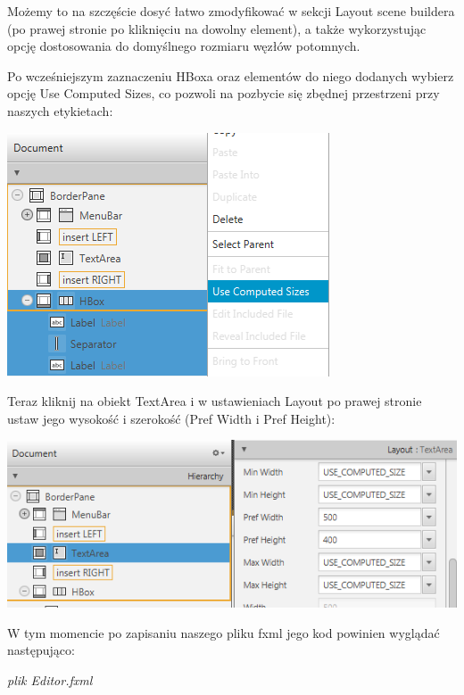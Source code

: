 \documentclass[letterpaper,10pt,english]{sphinxmanual}
\begin{document}
Możemy to na szczęście dosyć łatwo zmodyfikować w sekcji Layout scene buildera (po prawej stronie po kliknięciu na dowolny element), a także wykorzystując opcję dostosowania do domyślnego rozmiaru węzłów potomnych.

Po wcześniejszym zaznaczeniu HBoxa oraz elementów do niego dodanych wybierz opcję Use Computed Sizes, co pozwoli na pozbycie się zbędnej przestrzeni przy naszych etykietach:

{\hfill\includegraphics{computedsizes.png}\hfill}

Teraz kliknij na obiekt TextArea i w ustawieniach Layout po prawej stronie ustaw jego wysokość i szerokość (Pref Width i Pref Height):

{\hfill\includegraphics{widthheight.png}\hfill}

W tym momencie po zapisaniu naszego pliku fxml jego kod powinien wyglądać następująco:

\emph{plik Editor.fxml}
\end{document}
